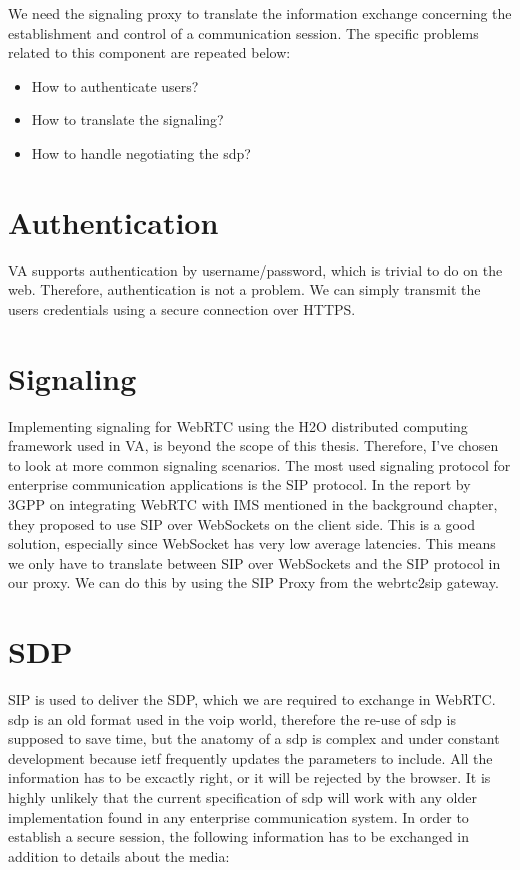 We need the signaling proxy to translate the information exchange concerning the establishment and control of a communication session. The specific problems related to this component are repeated below:

\begin{itemize}
\item{How to authenticate users?}
\item{How to translate the signaling?}
\item{How to handle negotiating the \gls{sdp}?}
\end{itemize}

\section{Authentication}
VA supports authentication by username/password, which is trivial to do on the web. Therefore, authentication is not a problem. We can simply transmit the users credentials using a secure connection over HTTPS.

\section{Signaling}
Implementing signaling for WebRTC using the H2O distributed computing framework used in VA, is beyond the scope of this thesis. Therefore, I've chosen to look at more common signaling scenarios. The most used signaling protocol for enterprise communication applications is the SIP protocol. In the report by 3GPP\cite{3gpp-wrtc-access-ims} on integrating WebRTC with IMS mentioned in the background chapter, they proposed to use SIP over WebSockets on the client side. This is a good solution, especially since WebSocket has very low average latencies\cite{websocket-overhead}. This means we only have to translate between SIP over WebSockets and the SIP protocol in our proxy. We can do this by using the SIP Proxy from the webrtc2sip gateway.

\section{SDP}
SIP is used to deliver the SDP, which we are required to exchange in WebRTC. \gls{sdp} is an old format used in the \gls{voip} world, therefore the re-use of \gls{sdp} is supposed to save time, but the anatomy of a \gls{sdp} is complex and under constant development because \gls{ietf} frequently updates the parameters to include. All the information has to be excactly right, or it will be rejected by the browser. It is highly unlikely that the current specification of \gls{sdp} will work with any older implementation found in any enterprise communication system. In order to establish a secure session, the following information has to be exchanged in addition to details about the media:

